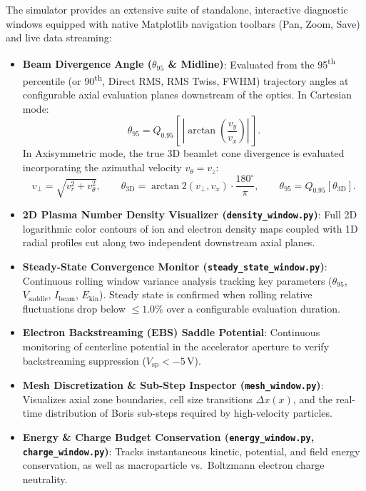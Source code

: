\documentclass[11pt,a4paper]{article}
\begin{document}
The simulator provides an extensive suite of standalone, interactive diagnostic windows equipped with native Matplotlib navigation toolbars (Pan, Zoom, Save) and live data streaming:
\begin{itemize}[nosep]
    \item \textbf{Beam Divergence Angle ($\theta_{95}$ \& Midline)}: Evaluated from the 95\textsuperscript{th} percentile (or 90\textsuperscript{th}, Direct RMS, RMS Twiss, FWHM) trajectory angles at configurable axial evaluation planes downstream of the optics. In Cartesian mode:
    \begin{equation}
        \theta_{95} = Q_{0.95}\!\left[\,\left|\arctan\left(\frac{v_y}{v_x}\right)\right|\,\right].
    \end{equation}
    In Axisymmetric mode, the true 3D beamlet cone divergence is evaluated incorporating the azimuthal velocity $v_\theta = v_z$:
    \begin{equation}
        v_\perp = \sqrt{v_r^2 + v_\theta^2}, \qquad \theta_{\mathrm{3D}} = \arctan2(v_\perp, v_x) \cdot \frac{180^\circ}{\pi}, \qquad \theta_{95} = Q_{0.95}\left[\theta_{\mathrm{3D}}\right].
    \end{equation}
    \item \textbf{2D Plasma Number Density Visualizer (\texttt{density\_window.py})}: Full 2D logarithmic color contours of ion and electron density maps coupled with 1D radial profiles cut along two independent downstream axial planes.
    \item \textbf{Steady-State Convergence Monitor (\texttt{steady\_state\_window.py})}: Continuous rolling window variance analysis tracking key parameters ($\theta_{95}$, $V_{\mathrm{saddle}}$, $I_{\mathrm{beam}}$, $E_{\mathrm{kin}}$). Steady state is confirmed when rolling relative fluctuations drop below $\le 1.0\%$ over a configurable evaluation duration.
    \item \textbf{Electron Backstreaming (EBS) Saddle Potential}: Continuous monitoring of centerline potential in the accelerator aperture to verify backstreaming suppression ($V_{\mathrm{sp}} < -5\,\si{\volt}$).
    \item \textbf{Mesh Discretization \& Sub-Step Inspector (\texttt{mesh\_window.py})}: Visualizes axial zone boundaries, cell size transitions $\Delta x(x)$, and the real-time distribution of Boris sub-steps required by high-velocity particles.
    \item \textbf{Energy \& Charge Budget Conservation (\texttt{energy\_window.py}, \texttt{charge\_window.py})}: Tracks instantaneous kinetic, potential, and field energy conservation, as well as macroparticle vs.\ Boltzmann electron charge neutrality.

\end{itemize}
\end{document}

